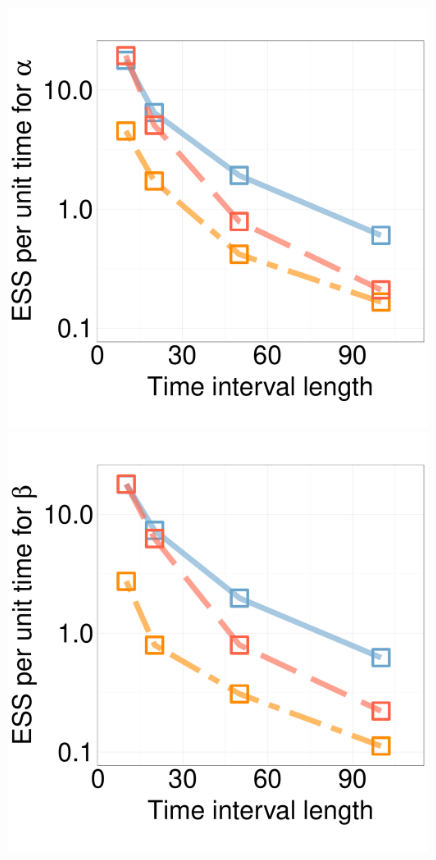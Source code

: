 \begin{figure}
\begin{minipage}[hp]{0.24\linewidth}
  \end{minipage}
  \begin{minipage}[hp]{0.24\linewidth}
  \centering
    \includegraphics [width=0.99\textwidth, angle=0]{figs/new_experiment_figs/ESS_vs_t_alpha.pdf}
      \end{minipage}
  \begin{minipage}[hp]{0.24\linewidth}
  \centering
    \includegraphics [width=0.99\textwidth, angle=0]{figs/new_experiment_figs/ESS_vs_t_beta.pdf}

\end{minipage}
\end{figure}
